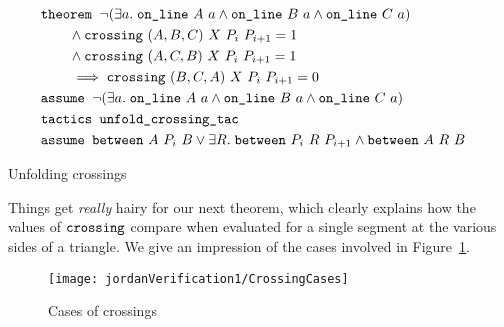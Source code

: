\begin{boxedfigure}
\small
\begin{align*}
&\texttt{theorem } \neg(\exists a.\; \texttt{on\_line}\ A\ a\wedge \texttt{on\_line}\ B\ a\wedge \texttt{on\_line}\ C\ a) &\\
&\qquad\wedge \texttt{crossing}\ (A,B,C)\ X\ P_i\ P_{i+1} = 1&\\
&\qquad\wedge \texttt{crossing}\ (A,C,B)\ X\ P_i\ P_{i+1} = 1&\\
&\qquad\implies \texttt{crossing}\ (B,C,A)\ X\ P_i\ P_{i+1} = 0&\\
&\texttt{assume } \neg(\exists a.\; \texttt{on\_line}\ A\ a\wedge \texttt{on\_line}\ B\ a\wedge \texttt{on\_line}\ C\ a)&\\
&\texttt{tactics } \texttt{unfold\_crossing\_tac}&\\
&\texttt{assume } \texttt{between}\ A\ P_i\ B \vee \exists R.\; \texttt{between}\ P_i\ R\ P_{i+1} \wedge \texttt{between}\ A\ R\ B
\end{align*}
\caption{Unfolding crossings}
\label{fig:UnfoldingCrossings}
\end{boxedfigure}

Things get \emph{really} hairy for our next theorem, which clearly explains how the values of $\texttt{crossing}$ compare when evaluated for a single segment at the various sides of a triangle. We give an impression of the cases involved in Figure~\ref{fig:CrossingCases}.

\begin{figure}
\centering\texttt{[image: jordanVerification1/CrossingCases]}
\caption{Cases of crossings}
\label{fig:CrossingCases}
\end{figure}

